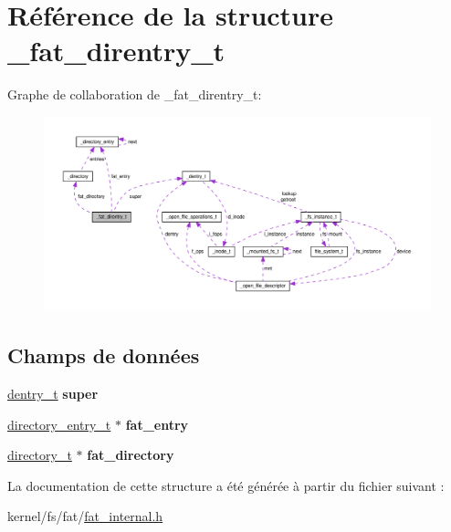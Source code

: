 \hypertarget{struct__fat__direntry__t}{\section{Référence de la structure \-\_\-fat\-\_\-direntry\-\_\-t}
\label{struct__fat__direntry__t}
}


Graphe de collaboration de \-\_\-fat\-\_\-direntry\-\_\-t\-:
\nopagebreak
\begin{figure}[H]
\begin{center}
\leavevmode
\includegraphics[width=350pt]{struct__fat__direntry__t__coll__graph}
\end{center}
\end{figure}
\subsection*{Champs de données}
\begin{DoxyCompactItemize}
\item 
\hypertarget{struct__fat__direntry__t_ad5c26f850433d9c813f416d3b5325b62}{\hyperlink{vfs_8h_ade5c998c6b3f09d2cf45d0e5ef8787da}{dentry\-\_\-t} {\bfseries super}}\label{struct__fat__direntry__t_ad5c26f850433d9c813f416d3b5325b62}

\item 
\hypertarget{struct__fat__direntry__t_a17b9dd242e07822ff9bc98a6a46e8c9e}{\hyperlink{fat__internal_8h_ab6546cb0abf935a615fae20884a41818}{directory\-\_\-entry\-\_\-t} $\ast$ {\bfseries fat\-\_\-entry}}\label{struct__fat__direntry__t_a17b9dd242e07822ff9bc98a6a46e8c9e}

\item 
\hypertarget{struct__fat__direntry__t_a15f0a5d5dcfd4fac4dbc9c3c976b33df}{\hyperlink{fat__internal_8h_a04e3d213fd143d58bbabf68062bdc21c}{directory\-\_\-t} $\ast$ {\bfseries fat\-\_\-directory}}\label{struct__fat__direntry__t_a15f0a5d5dcfd4fac4dbc9c3c976b33df}

\end{DoxyCompactItemize}


La documentation de cette structure a été générée à partir du fichier suivant \-:\begin{DoxyCompactItemize}
\item 
kernel/fs/fat/\hyperlink{fat__internal_8h}{fat\-\_\-internal.\-h}\end{DoxyCompactItemize}
